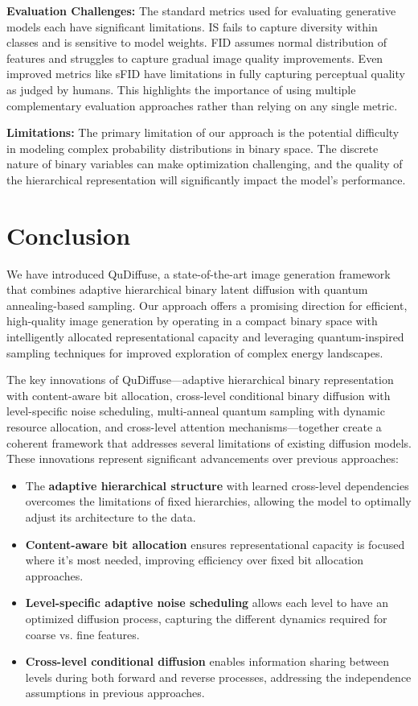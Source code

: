 \documentclass[10pt,twocolumn,letterpaper]{article}
\begin{document}
\textbf{Evaluation Challenges:} The standard metrics used for evaluating generative models each have significant limitations. IS fails to capture diversity within classes and is sensitive to model weights. FID assumes normal distribution of features and struggles to capture gradual image quality improvements. Even improved metrics like sFID have limitations in fully capturing perceptual quality as judged by humans. This highlights the importance of using multiple complementary evaluation approaches rather than relying on any single metric.

\textbf{Limitations:} The primary limitation of our approach is the potential difficulty in modeling complex probability distributions in binary space. The discrete nature of binary variables can make optimization challenging, and the quality of the hierarchical representation will significantly impact the model's performance.

\section{Conclusion}
\label{sec:conclusion}

We have introduced QuDiffuse, a state-of-the-art image generation framework that combines adaptive hierarchical binary latent diffusion with quantum annealing-based sampling. Our approach offers a promising direction for efficient, high-quality image generation by operating in a compact binary space with intelligently allocated representational capacity and leveraging quantum-inspired sampling techniques for improved exploration of complex energy landscapes.

The key innovations of QuDiffuse—adaptive hierarchical binary representation with content-aware bit allocation, cross-level conditional binary diffusion with level-specific noise scheduling, multi-anneal quantum sampling with dynamic resource allocation, and cross-level attention mechanisms—together create a coherent framework that addresses several limitations of existing diffusion models. These innovations represent significant advancements over previous approaches:

\begin{itemize}
    \item The \textbf{adaptive hierarchical structure} with learned cross-level dependencies overcomes the limitations of fixed hierarchies, allowing the model to optimally adjust its architecture to the data.
    \item \textbf{Content-aware bit allocation} ensures representational capacity is focused where it's most needed, improving efficiency over fixed bit allocation approaches.
    \item \textbf{Level-specific adaptive noise scheduling} allows each level to have an optimized diffusion process, capturing the different dynamics required for coarse vs. fine features.
    \item \textbf{Cross-level conditional diffusion} enables information sharing between levels during both forward and reverse processes, addressing the independence assumptions in previous approaches.
\end{itemize}
\end{document}

